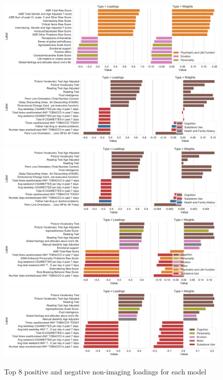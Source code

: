 \begin{figure}
\centering
\includegraphics[width=0.8\linewidth]{figures/regularization/hcp/PCA behaviour weights and loadings}
\includegraphics[width=0.8\linewidth]{figures/regularization/hcp/RCCA behaviour weights and loadings}
\includegraphics[width=0.8\linewidth]{figures/regularization/hcp/ElasticNet behaviour weights and loadings}
\includegraphics[width=0.8\linewidth]{figures/regularization/hcp/PLS behaviour weights and loadings}
\includegraphics[width=0.8\linewidth]{figures/regularization/hcp/SPLS behaviour weights and loadings}
\caption{Top 8 positive and negative non-imaging loadings for each model}\label{fig:behaviour}
\end{figure}

